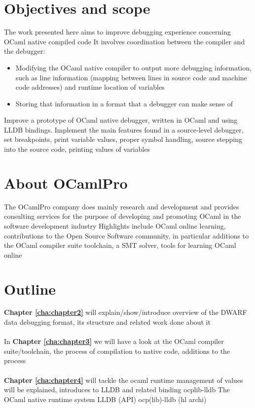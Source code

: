 \section{Objectives and scope\label{sec:objective}}

The work presented here aims to improve debugging experience concerning OCaml native compiled code
It involves coordination between the compiler and the debugger:

\begin{itemize}
    \item Modifying the OCaml native compiler to output more debugging information, such as line information (mapping between lines in source code and machine code addresses) and runtime location of variables
    \item Storing that information in a format that a debugger can make sense of
\end{itemize}

Improve a prototype of OCaml native debugger, written in OCaml and using LLDB bindings.
Implement the main features found in a source-level debugger,
set breakpoints, print variable values, proper symbol handling, source stepping into the source code, printing values of variables

\section{About OCamlPro\label{sec:scope}}

The OCamlPro company does mainly research and development and provides consulting services for the purpose of developing and promoting OCaml in the software development industry
Highlights include OCaml online learning, contributions to the Open Source Software community, in particular additions to
the OCaml compiler suite toolchain, a SMT solver, tools for learning OCaml online


\section{Outline\label{sec:outline}}

\textbf{Chapter \ref{cha:chapter2}} will explain/show/introduce overview of the DWARF data debugging format, its structure and related work done about it
\\
\\
In \textbf{Chapter \ref{cha:chapter3}} we will have a look at the OCaml compiler suite/toolchain, the process of compilation to native code, additions to the process
\\
\\
\textbf{Chapter \ref{cha:chapter4}} will tackle the ocaml runtime management of values will be explained, introduces to LLDB and related binding ocplib-lldb
The OCaml native runtime system
LLDB (API)
ocp(lib)-lldb (hl archi)


